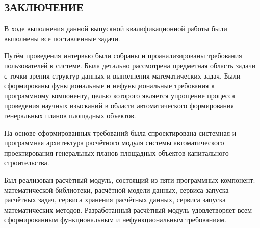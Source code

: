 \begin{center}
    \section*{\large{ЗАКЛЮЧЕНИЕ}}
\end{center}

В ходе выполнения данной выпускной квалификационной работы были выполнены все поставленные задачи.

Путём проведения интервью были собраны и проанализированы требования пользователей к системе.
Была детально рассмотрена предметная область задачи с точки зрения структур данных
и выполнения математических задач.
Были сформированы функциональные и нефункциональные требования к программному компоненту, целью
которого является упрощение процесса проведения научных изысканий
в области автоматического формирования генеральных планов площадных объектов.

На основе сформированных требований была спроектирована системная и программная архитектура
расчётного модуля системы автоматического проектирования генеральных
планов площадных объектов капитального строительства.

Был реализован расчётный модуль, состоящий из пяти программных компонент: математической библиотеки,
расчётной модели данных, сервиса запуска расчётных задач, сервиса хранения расчётных данных,
сервиса запуска математических методов.
Разработанный расчётный модуль удовлетворяет всем сформированным функциональным и нефункциональным требованиям.
